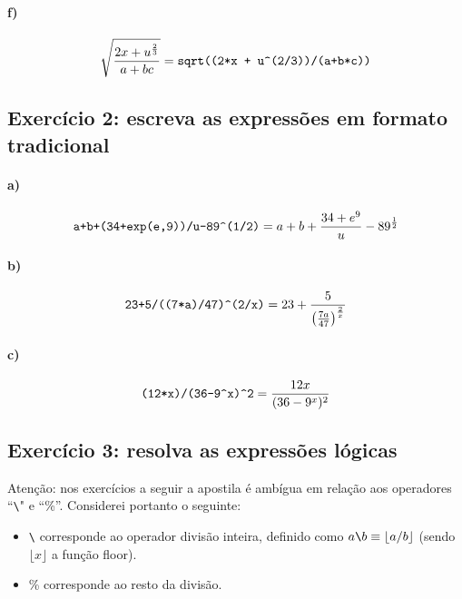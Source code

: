\documentclass[pdftex,a4paper,12pt,brazil]{article} %
\begin{document}
\paragraph{f)} $$\sqrt{\frac{2x + u^{\frac{2}{3}}}{a + bc}} = \verb!sqrt((2*x + u^(2/3))/(a+b*c))!$$


\subsection{Exercício 2: escreva as expressões em formato tradicional}
\label{grupo_2}

\paragraph{a)} $$\verb!a+b+(34+exp(e,9))/u-89^(1/2)! = a + b + \frac{34+e^9}{u} - 89^{\frac{1}{2}}$$

\paragraph{b)} $$\verb!23+5/((7*a)/47)^(2/x)! = 23 + \frac{5}{\left(\frac{7a}{47}\right)^{\frac{2}{x}}} $$

\paragraph{c)} $$\verb!(12*x)/(36-9^x)^2! = \frac{12x}{(36-9^x)^2}$$


\subsection{Exercício 3: resolva as expressões lógicas}
\label{grupo_3}

Atenção: nos exercícios a seguir a apostila é ambígua em relação aos operadores ``\verb!\!" e
``\%''. Considerei portanto o seguinte:

\begin{itemize}
\item \verb!\! corresponde ao operador divisão inteira, definido como $a\verb!\!b \equiv \left \lfloor{a/b}\right \rfloor$
  (sendo $\lfloor{x}\rfloor$ a função floor).
  \item \% corresponde ao resto da divisão.
\end{itemize}
\end{document}

